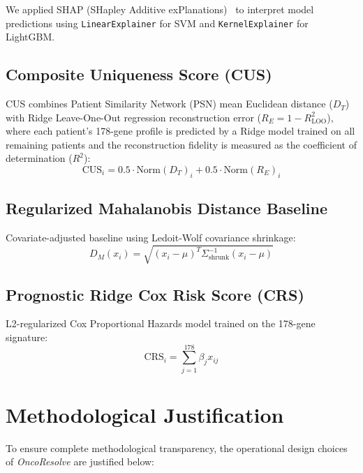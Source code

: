 \documentclass[10pt,a4paper,twocolumn]{article}
\begin{document}
We applied SHAP (SHapley Additive exPlanations)~\cite{lundberg2017} to interpret model predictions using \texttt{LinearExplainer} for SVM and \texttt{KernelExplainer} for LightGBM.

\subsection{Composite Uniqueness Score (CUS)}

CUS combines Patient Similarity Network (PSN) mean Euclidean distance ($D_T$) with Ridge Leave-One-Out regression reconstruction error ($R_E = 1 - R^2_{\text{LOO}}$), where each patient's 178-gene profile is predicted by a Ridge model trained on all remaining patients and the reconstruction fidelity is measured as the coefficient of determination ($R^2$):
$$\text{CUS}_i = 0.5 \cdot \text{Norm}(D_T)_i + 0.5 \cdot \text{Norm}(R_E)_i$$

\subsection{Regularized Mahalanobis Distance Baseline}

Covariate-adjusted baseline using Ledoit-Wolf covariance shrinkage:
$$D_M(x_i) = \sqrt{(x_i - \mu)^T \Sigma_{\text{shrunk}}^{-1} (x_i - \mu)}$$

\subsection{Prognostic Ridge Cox Risk Score (CRS)}

L2-regularized Cox Proportional Hazards model trained on the 178-gene signature:
$$\text{CRS}_i = \sum_{j=1}^{178} \beta_j x_{ij}$$

\section{Methodological Justification}

To ensure complete methodological transparency, the operational design choices of \textit{OncoResolve} are justified below:
\end{document}
